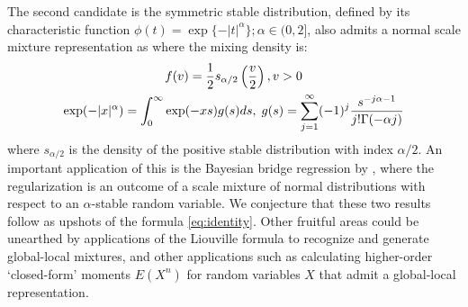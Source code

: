\documentclass[letterpaper,11pt]{article}
\begin{document}
The second candidate is the symmetric stable distribution, defined by its characteristic function $\phi(t) = \exp\{ -|t|^{\alpha} \}; \alpha \in (0,2]$, also admits a normal scale mixture representation as where the mixing density is: 
\begin{gather*}
f(v) = \frac{1}{2} s_{\alpha/2} \left( \frac{v}{2} \right), v > 0 \\
\exp(-|x|^\alpha) = \int_0^{\infty} \exp(-xs) g(s) ds, \; g(s) = \sum_{j=1}^{\infty} (-1)^j \frac{s^{-j\alpha-1}}{j! \Gamma(-\alpha j)}
\end{gather*}
where $s_{\alpha/2}$ is the density of the positive stable distribution with index $\alpha / 2$. An important application of this is the Bayesian bridge regression by \cite{polson2014bayesian}, where the regularization is an outcome of a scale mixture of normal distributions with respect to an $\alpha$-stable random variable. We conjecture that these two results follow as upshots of the \CS formula \eqref{eq:identity}. Other fruitful areas could be unearthed by applications of the Liouville formula to recognize and generate global-local mixtures, and other applications such as calculating higher-order `closed-form' moments $E(X^n)$ for random variables $X$ that admit a global-local representation. 



\end{document}
